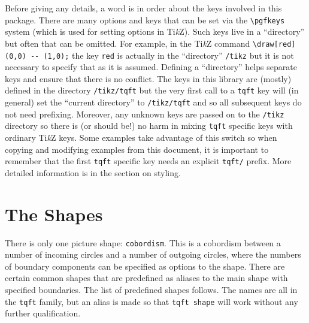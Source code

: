 \documentclass{ltxdoc}
\begin{document}
Before giving any details, a word is in order about the keys involved in this package.
There are many options and keys that can be set via the \Verb+\pgfkeys+ system (which is used for setting options in Ti\emph{k}Z).
Such keys live in a ``directory'' but often that can be omitted.
For example, in the Ti\emph{k}Z command \Verb+\draw[red] (0,0) -- (1,0);+ the key \Verb+red+ is actually in the ``directory'' \Verb+/tikz+ but it is not necessary to specify that as it is assumed.
Defining a ``directory'' helps separate keys and ensure that there is no conflict.
The keys in this library are (mostly) defined in the directory \Verb+/tikz/tqft+ but the very first call to a \Verb+tqft+ key will (in general) set the ``current directory'' to \Verb+/tikz/tqft+ and so all subsequent keys do not need prefixing.
Moreover, any unknown keys are passed on to the \Verb+/tikz+ directory so there is (or should be!) no harm in mixing \Verb+tqft+ specific keys with ordinary Ti\emph{k}Z keys.
Some examples take advantage of this switch so when copying and modifying examples from this document, it is important to remember that the first \Verb+tqft+ specific key needs an explicit \Verb+tqft/+ prefix.
More detailed information is in the section on styling.

\section{The Shapes}

There is only one picture shape: \Verb+cobordism+.
This is a cobordism between a number of incoming circles and a number of outgoing circles, where the numbers of boundary components can be specified as options to the shape.
There are certain common shapes that are predefined as aliases to the main shape with specified boundaries.
The list of predefined shapes follows.
The names are all in the \Verb+tqft+ family, but an alias is made so that \Verb+tqft shape+ will work without any further qualification.
\end{document}
